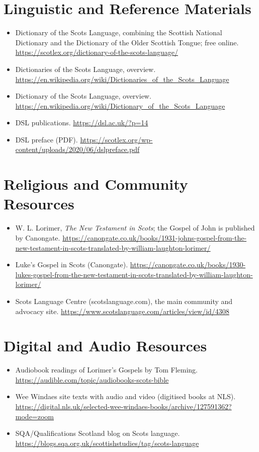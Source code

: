 \documentclass[12pt]{article}
\begin{document}
\section{Linguistic and Reference Materials}
\begin{itemize}
\item Dictionary of the Scots Language, combining the Scottish National Dictionary and the Dictionary of the Older Scottish Tongue; free online. \url{https://scotlex.org/dictionary-of-the-scots-language/}
\item Dictionaries of the Scots Language, overview. \url{https://en.wikipedia.org/wiki/Dictionaries_of_the_Scots_Language}
\item Dictionary of the Scots Language, overview. \url{https://en.wikipedia.org/wiki/Dictionary_of_the_Scots_Language}
\item DSL publications. \url{https://dsl.ac.uk/?p=14}
\item DSL preface (PDF). \url{https://scotlex.org/wp-content/uploads/2020/06/dslpreface.pdf}
\end{itemize}

\section{Religious and Community Resources}
\begin{itemize}
\item W. L. Lorimer, \emph{The New Testament in Scots}; the Gospel of John is published by Canongate. \url{https://canongate.co.uk/books/1931-johns-gospel-from-the-new-testament-in-scots-translated-by-william-laughton-lorimer/}
\item Luke's Gospel in Scots (Canongate). \url{https://canongate.co.uk/books/1930-lukes-gospel-from-the-new-testament-in-scots-translated-by-william-laughton-lorimer/}
\item Scots Language Centre (scotslanguage.com), the main community and advocacy site. \url{https://www.scotslanguage.com/articles/view/id/4308}
\end{itemize}

\section{Digital and Audio Resources}
\begin{itemize}
\item Audiobook readings of Lorimer's Gospels by Tom Fleming. \url{https://audible.com/topic/audiobooks-scots-bible}
\item Wee Windaes site texts with audio and video (digitised books at NLS). \url{https://digital.nls.uk/selected-wee-windaes-books/archive/127591362?mode=zoom}
\item SQA/Qualifications Scotland blog on Scots language. \url{https://blogs.sqa.org.uk/scottishstudies/tag/scots-language}
\end{itemize}
\end{document}
